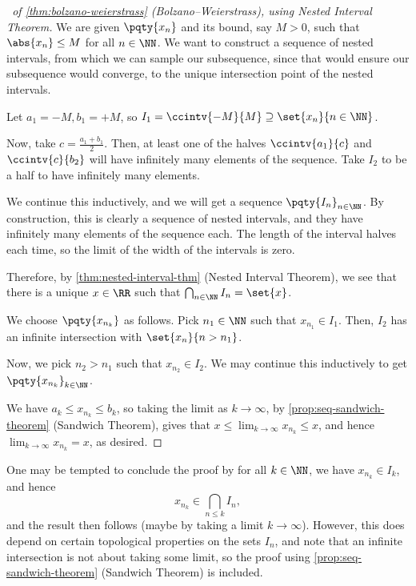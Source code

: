\begin{proof}[\proofname\ of \autoref{thm:bolzano-weierstrass} (Bolzano--Weierstrass), using Nested Interval Theorem]
    We are given \(\pqty{x_n}\) and its bound, say \(M > 0\), such that \(\abs{x_n} \leq M\) for all \(n \in \NN\). We want to construct a sequence of nested intervals, from which we can sample our subsequence, since that would ensure our subsequence would converge, to the unique intersection point of the nested intervals.

    Let \(a_1 = -M, b_1 = +M\), so \(I_1 = \ccintv{-M}{M} \supseteq \set{x_n}{n \in \NN}\).

    Now, take \(c = \frac{a_1 + b_1}{2}\). Then, at least one of the halves \(\ccintv{a_1}{c}\) and \(\ccintv{c}{b_2}\) will have infinitely many elements of the sequence. Take \(I_2\) to be a half to have infinitely many elements.

    We continue this inductively, and we will get a sequence \(\pqty{I_n}_{n \in \NN}\). By construction, this is clearly a sequence of nested intervals, and they have infinitely many elements of the sequence each. The length of the interval halves each time, so the limit of the width of the intervals is zero.

    Therefore, by \autoref{thm:nested-interval-thm} (Nested Interval Theorem), we see that there is a unique \(x \in \RR\) such that \(\bigcap_{n \in \NN} I_n = \set{x}\).

    We choose \(\pqty{x_{n_k}}\) as follows. Pick \(n_1 \in \NN\) such that \(x_{n_1} \in I_1\). Then, \(I_2\) has an infinite intersection with \(\set{x_n}{n > n_1}\).

    Now, we pick \(n_2 > n_1\) such that \(x_{n_2} \in I_2\). We may continue this inductively to get \(\pqty{x_{n_k}}_{k \in \NN}\).

    We have \(a_k \leq x_{n_k} \leq b_k\), so taking the limit as \(k \to \infty\), by \autoref{prop:seq-sandwich-theorem} (Sandwich Theorem), gives that \(x \leq \lim_{k \to \infty} x_{n_k} \leq x\), and hence \(\lim_{k \to \infty} x_{n_k} = x\), as desired.
\end{proof}

\begin{remark}
    One may be tempted to conclude the proof by for all \(k \in \NN\), we have \(x_{n_k} \in I_k\), and hence
    \[
        x_{n_k} \in \bigcap_{n \leq k} I_n,
    \]
    and the result then follows (maybe by taking a limit \(k \to \infty\)). However, this does depend on certain topological properties on the sets \(I_n\), and note that an infinite intersection is not about taking some limit, so the proof using \autoref{prop:seq-sandwich-theorem} (Sandwich Theorem) is included.
\end{remark}

